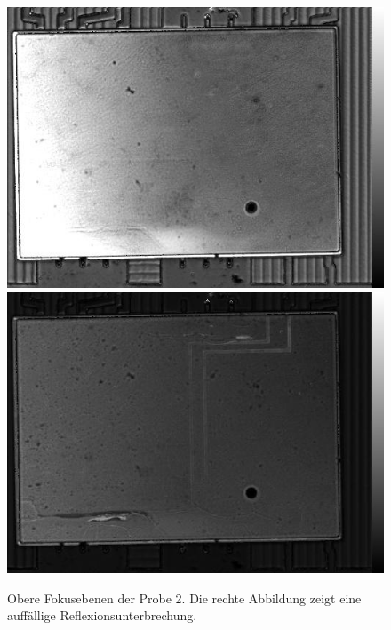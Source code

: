 \begin{figure}[htbp]
    \centering
    \includegraphics[scale=0.30]{Bilder/Probe2_i794_x001.jpg}
    \includegraphics[scale=0.30]{Bilder/Probe2_i794_x002.jpg}
    \caption{Obere Fokusebenen der Probe 2. Die rechte Abbildung zeigt eine auffällige Reflexionsunterbrechung.}
    \label{Abbildung 8_1:probe2_1}
    \label{Abbildung 8_2:probe2_2}
\end{figure}


